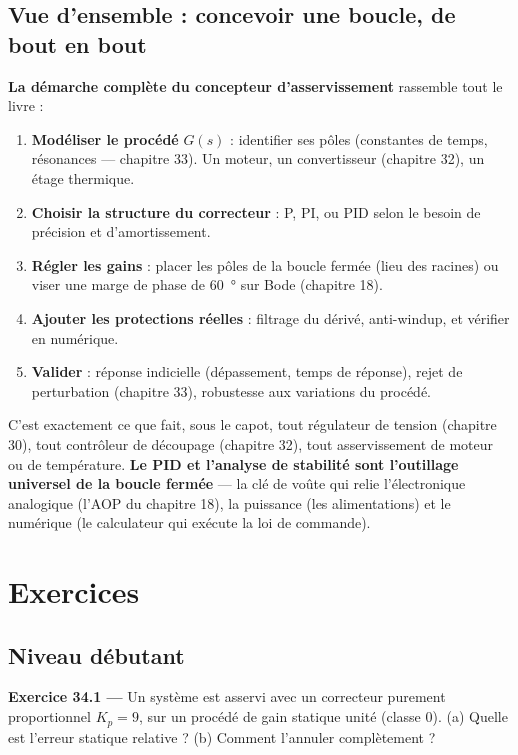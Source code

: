 \documentclass[12pt,a4paper,twoside]{book}
\begin{document}
\subsection{Vue d'ensemble : concevoir une boucle, de bout en bout}

\begin{intuition}
\textbf{La démarche complète du concepteur d'asservissement} rassemble tout le livre :
\begin{enumerate}[nosep]
\item \textbf{Modéliser le procédé} $G(s)$ : identifier ses pôles (constantes de temps, résonances --- chapitre 33). Un moteur, un convertisseur (chapitre 32), un étage thermique.
\item \textbf{Choisir la structure du correcteur} : P, PI, ou PID selon le besoin de précision et d'amortissement.
\item \textbf{Régler les gains} : placer les pôles de la boucle fermée (lieu des racines) ou viser une marge de phase de \SI{60}{°} sur Bode (chapitre 18).
\item \textbf{Ajouter les protections réelles} : filtrage du dérivé, anti-windup, et vérifier en numérique.
\item \textbf{Valider} : réponse indicielle (dépassement, temps de réponse), rejet de perturbation (chapitre 33), robustesse aux variations du procédé.
\end{enumerate}
C'est exactement ce que fait, sous le capot, tout régulateur de tension (chapitre 30), tout contrôleur de découpage (chapitre 32), tout asservissement de moteur ou de température. \textbf{Le PID et l'analyse de stabilité sont l'outillage universel de la boucle fermée} --- la clé de voûte qui relie l'électronique analogique (l'AOP du chapitre 18), la puissance (les alimentations) et le numérique (le calculateur qui exécute la loi de commande).
\end{intuition}

\section*{Exercices}

\subsection*{Niveau débutant}

\textbf{Exercice 34.1 ---} Un système est asservi avec un correcteur purement proportionnel $K_p = 9$, sur un procédé de gain statique unité (classe 0). (a) Quelle est l'erreur statique relative ? (b) Comment l'annuler complètement ?
\end{document}

